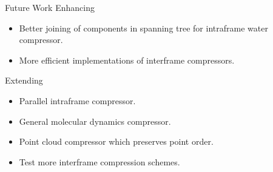 \documentclass{beamer}
\begin{document}
\begin{frame}{Future Work}
  Enhancing
  \begin{itemize}
  \item Better joining of components in spanning tree for intraframe water
    compressor.
  \item More efficient implementations of interframe compressors.
  \end{itemize}
  Extending
  \begin{itemize}
  \item Parallel intraframe compressor.
  \item General molecular dynamics compressor.
  \item Point cloud compressor which preserves point order.
  \item Test more interframe compression schemes.
  \end{itemize}
\end{frame}
\end{document}
